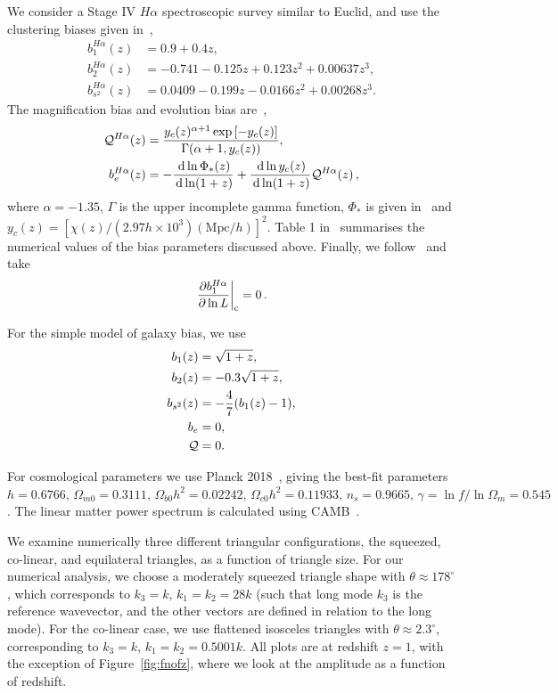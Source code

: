 {We consider a Stage IV \(H\alpha\) spectroscopic survey similar to Euclid, and use the clustering biases given in~\cite{Maartens:2019yhx}, 
\begin{align}
	b^{H\alpha}_1(z) &= 0.9 + 0.4 z,\\
	b^{H\alpha}_2(z) &= -0.741 - 0.125 z + 0.123 z^2 + 0.00637 z^3,\\
	b^{H\alpha}_{s^2}(z) &= 0.0409 - 0.199 z - 0.0166 z^2 + 0.00268 z^3.
\end{align}
The magnification bias and evolution bias are~\cite{Maartens:2019yhx},
\begin{align}
	\Q^{H\alpha}(z) &= \frac{ y_c(z)^{\alpha + 1} \exp\left[-y_c(z)\right] }{\Gamma(\alpha+1, y_c(z))},\\
	b_e^{H\alpha}(z) &= - \frac{\diff \ln \Phi_\ast (z)}{\diff \ln(1+z)} + \frac{\diff \ln y_c(z)}{\diff \ln (1+z)}\Q^{H\alpha}(z)\,,
\end{align}
where \(\alpha = - 1.35\), \(\Gamma\) is the upper incomplete gamma function, \(\Phi_\ast\) is given in~\cite{Maartens:2019yhx} and \(y_c(z) = \left[ \chi(z) / \left( 2.97 h \times 10^3 \right) (\mathrm{Mpc}/h) \right]^2\). Table 1 in~\cite{Maartens:2019yhx} summarises the numerical values of the bias parameters discussed above. Finally, we follow~\cite{Maartens:2019yhx} and take
\begin{equation}
	\evaluat*{\frac{\partial b_1^{H\alpha}}{\partial \ln L}}_\text{c} = 0\,.
\end{equation}


For the simple model of galaxy bias, we use
\begin{align}
	b_1(z) &= \sqrt{1+z}, \\
	b_2(z) &= -0.3 \sqrt{1+z}, \\
	b_{s^2}(z) &= - \frac{4}{7} (b_1(z) -1),\\
	b_e &= 0, \\
	\Q &= 0.
\end{align}

For cosmological parameters we use Planck 2018~\cite{Aghanim:2018eyx}, giving the best-fit parameters \(h = 0.6766,\,\Omega_{m0}=0.3111,\,\Omega_{b0}h^2=0.02242,\,\Omega_{c0}h^2 = 0.11933,\,n_s = 0.9665,\,\gamma = \ln f / \ln \Omega_m = 0.545\). The linear matter power spectrum is calculated using CAMB~\cite{Lewis:1999bs}.

We examine numerically three different triangular configurations, the squeezed, co-linear, and equilateral triangles, as a function of triangle size. For our numerical analysis, we choose a moderately squeezed triangle shape with \(\theta\approx 178^\circ\), which corresponds to \(k_3 = k, \, k_1 = k_2 = 28k\) (such that long mode \(k_3\) is the reference wavevector, and the other vectors are defined in relation to the long mode). For the co-linear case, we use flattened isosceles triangles with \(\theta  \approx 2.3^\circ\), corresponding to \(k_3 = k, \, k_1 = k_2 = 0.5001 k.\) All plots are at redshift \(z=1\), with the exception of Figure~\ref{fig:fnofz}, where we look at the amplitude as a function of redshift. 

}
